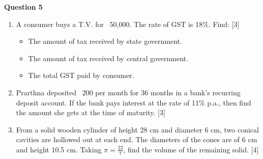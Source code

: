 \newpage
\noindent
\textbf{Question 5}
\begin{enumerate}[label=(\roman*)]

    \item A consumer buys a T.V. for \rupee~50,000. The rate of GST is 18\%. Find: \hfill [3]
        \begin{itemize}
            \setlength\itemsep{0em}
            \item The amount of tax received by state government.
            \item The amount of tax received by central government.
            \item The total GST paid by consumer.
        \end{itemize}

    \item Prarthna deposited \rupee~200 per month for 36 months in a bank's 
        recurring deposit account. If the bank pays interest at the rate of 
        11\% p.a., then find the amount she gets at the time of maturity. \hfill [3]

    \item From a solid wooden cylinder of height 28 cm and diameter 6 cm, 
        two conical cavities are hollowed out at each end. The diameters of the cones 
        are of 6 cm and height 10.5 cm. Taking $\pi = \frac{22}{7}$, 
        find the volume of the remaining solid. \hfill [4]

\end{enumerate}

